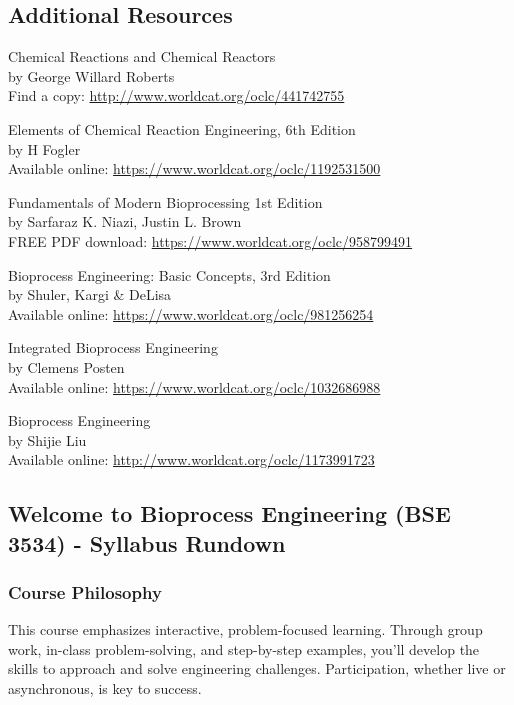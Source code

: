 \documentclass[
]{article}
\begin{document}
\hypertarget{additional-resources}{%
\subsection{Additional Resources}\label{additional-resources}}

Chemical Reactions and Chemical Reactors\\
by George Willard Roberts\\
Find a copy: \url{http://www.worldcat.org/oclc/441742755}

Elements of Chemical Reaction Engineering, 6th Edition\\
by H Fogler\\
Available online: \url{https://www.worldcat.org/oclc/1192531500}

Fundamentals of Modern Bioprocessing 1st Edition\\
by Sarfaraz K. Niazi, Justin L. Brown\\
FREE PDF download: \url{https://www.worldcat.org/oclc/958799491}

Bioprocess Engineering: Basic Concepts, 3rd Edition\\
by Shuler, Kargi \& DeLisa\\
Available online: \url{https://www.worldcat.org/oclc/981256254}

Integrated Bioprocess Engineering\\
by Clemens Posten\\
Available online: \url{https://www.worldcat.org/oclc/1032686988}

Bioprocess Engineering\\
by Shijie Liu\\
Available online: \url{http://www.worldcat.org/oclc/1173991723}

\hypertarget{welcome-to-bioprocess-engineering-bse-3534---syllabus-rundown}{%
\subsection{Welcome to Bioprocess Engineering (BSE 3534) - Syllabus Rundown}\label{welcome-to-bioprocess-engineering-bse-3534---syllabus-rundown}}

\hypertarget{course-philosophy}{%
\subsubsection{Course Philosophy}\label{course-philosophy}}

This course emphasizes interactive, problem-focused learning. Through group work, in-class problem-solving, and step-by-step examples, you'll develop the skills to approach and solve engineering challenges. Participation, whether live or asynchronous, is key to success.
\end{document}
